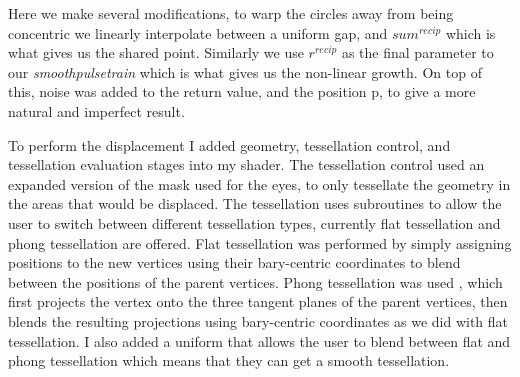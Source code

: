 \documentclass[]{acmsiggraph}
\begin{document}
\newline
 Here we make several modifications, to warp the circles away from being concentric we linearly interpolate between a uniform gap, and $sum^{recip}$ which is what gives us the shared point. Similarly we use $r^{recip}$ as the final parameter to our \textit{smoothpulsetrain} which is what gives us the non-linear growth.
On top of this, noise was added to the return value, and the position p, to give a more natural and imperfect result.

To perform the displacement I added geometry, tessellation control, and tessellation evaluation stages into my shader. The tessellation control used an expanded version of the mask used for the eyes, to only tessellate the geometry in the areas that would be displaced. The tessellation uses subroutines to allow the user to switch between different tessellation types, currently flat tessellation and phong tessellation are offered. Flat tessellation was performed by simply assigning positions to the new vertices using their bary-centric coordinates to blend between the positions of the parent vertices. Phong tessellation was used \cite{Boubekeur:2008:PhongTess}, which first projects the vertex onto the three tangent planes of the parent vertices, then blends the resulting projections using bary-centric coordinates as we did with flat tessellation. I also added a uniform that allows the user to blend between flat and phong tessellation which means that they can get a smooth tessellation. 

\begin{figure}[htbp]
  \centering
 \hfill
 \hfill
\end{figure}
\end{document}
